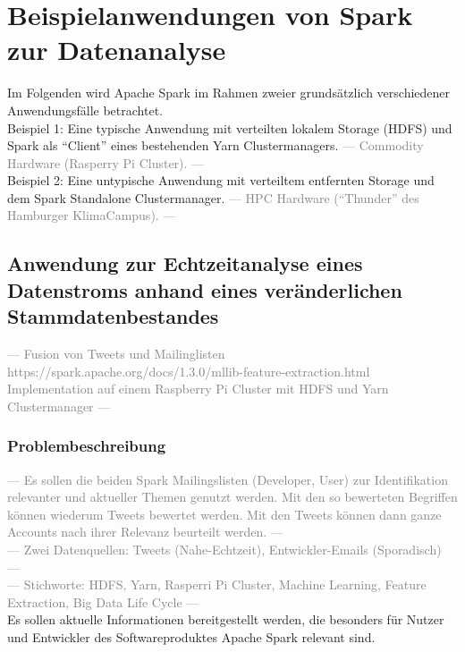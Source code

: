 \chapter{Beispielanwendungen von Spark zur Datenanalyse}
Im Folgenden wird Apache Spark im Rahmen zweier grundsätzlich verschiedener Anwendungsfälle betrachtet. \\

Beispiel 1: Eine typische Anwendung mit verteilten lokalem Storage (HDFS) und Spark als "`Client"' eines bestehenden Yarn Clustermanagers. \textcolor{gray}{--- Commodity Hardware (Rasperry Pi Cluster). ---}\\


Beispiel 2: Eine untypische Anwendung mit verteiltem entfernten Storage und dem Spark Standalone Clustermanager. \textcolor{gray}{--- HPC Hardware ("`Thunder"' des Hamburger KlimaCampus). ---}\\

\section{Anwendung zur Echtzeitanalyse eines Datenstroms anhand eines veränderlichen Stammdatenbestandes}
\textcolor{gray}{--- Fusion von Tweets und Mailinglisten 
https://spark.apache.org/docs/1.3.0/mllib-feature-extraction.html
Implementation auf einem Raspberry Pi Cluster mit HDFS und Yarn Clustermanager ---}\\
\subsection{Problembeschreibung}
\textcolor{gray}{--- Es sollen die beiden Spark Mailingslisten (Developer, User) zur Identifikation relevanter und aktueller Themen genutzt werden. Mit den so bewerteten Begriffen können wiederum Tweets bewertet werden. Mit den Tweets können dann ganze Accounts nach ihrer Relevanz beurteilt werden. ---}\\
\textcolor{gray}{--- Zwei Datenquellen: Tweets (Nahe-Echtzeit), Entwickler-Emails (Sporadisch) ---}\\
\textcolor{gray}{--- Stichworte: HDFS, Yarn, Rasperri Pi Cluster, Machine Learning, Feature Extraction, Big Data Life Cycle ---}\\

Es sollen aktuelle Informationen bereitgestellt werden, die besonders für Nutzer und Entwickler des Softwareproduktes Apache Spark relevant sind.\\



